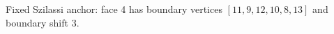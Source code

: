 \begin{center}\small
Fixed Szilassi anchor: face 4 has boundary vertices $[11,9,12,10,8,13]$ and boundary shift $3$.
\end{center}
